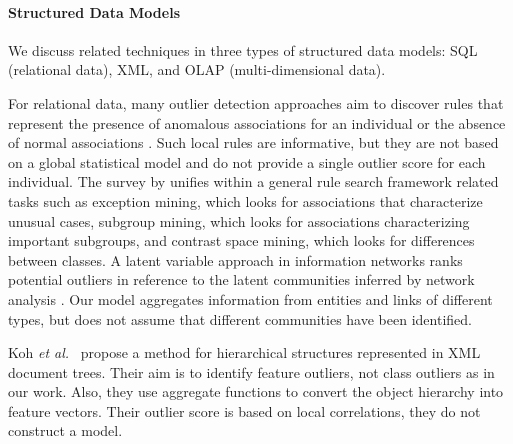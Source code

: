 \documentclass[conference]{IEEEtran}
\begin{document}
\paragraph{Structured Data Models} We discuss related techniques in three types of structured data models: SQL (relational data), XML, and OLAP (multi-dimensional data). 

For relational data, many outlier detection approaches aim to discover rules that represent the presence of anomalous associations for an individual or the absence of normal associations \cite{Maervoet2012,Gao2010}. Such local rules are informative, but they are not based on a global statistical model and do not provide a single outlier score for each individual. The survey by \cite{Novak2009} unifies within a general rule search framework related tasks such as exception mining, which looks for associations that characterize unusual cases, subgroup mining, which looks for associations  characterizing important subgroups, and contrast space mining, which looks for differences between classes.  A latent variable approach in information networks ranks potential outliers in reference to the latent communities inferred by network analysis \cite{Gao2010}. Our model aggregates information from entities and links of different types, but does not assume that different communities have been identified. 


Koh {\em et al.}~\cite{Koh2008} propose a method for hierarchical structures represented in XML document trees. Their aim is to identify feature outliers, not class outliers as in our work. Also, they use aggregate functions to convert the object hierarchy into feature vectors. Their outlier score is based on local correlations, they do not construct a model.
\end{document}
